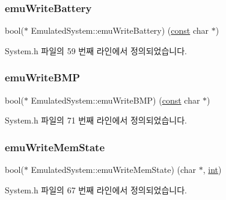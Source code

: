 \subsubsection{\texorpdfstring{emu\+Write\+Battery}{emuWriteBattery}}
{\footnotesize\ttfamily bool($\ast$ Emulated\+System\+::emu\+Write\+Battery) (\mbox{\hyperlink{getopt1_8c_a2c212835823e3c54a8ab6d95c652660e}{const}} char $\ast$)}



System.\+h 파일의 59 번째 라인에서 정의되었습니다.

\mbox{\label{struct_emulated_system_a3196ed548c01811a8c482294d68ec56b}} 
\subsubsection{\texorpdfstring{emu\+Write\+B\+MP}{emuWriteBMP}}
{\footnotesize\ttfamily bool($\ast$ Emulated\+System\+::emu\+Write\+B\+MP) (\mbox{\hyperlink{getopt1_8c_a2c212835823e3c54a8ab6d95c652660e}{const}} char $\ast$)}



System.\+h 파일의 71 번째 라인에서 정의되었습니다.

\mbox{\label{struct_emulated_system_a91e29689742db5aa32a73c2f5698605a}} 
\subsubsection{\texorpdfstring{emu\+Write\+Mem\+State}{emuWriteMemState}}
{\footnotesize\ttfamily bool($\ast$ Emulated\+System\+::emu\+Write\+Mem\+State) (char $\ast$, \mbox{\hyperlink{_util_8cpp_a0ef32aa8672df19503a49fab2d0c8071}{int}})}



System.\+h 파일의 67 번째 라인에서 정의되었습니다.

\mbox{\label{struct_emulated_system_a741364ed335ac65cc30c6749896274bc}} 
